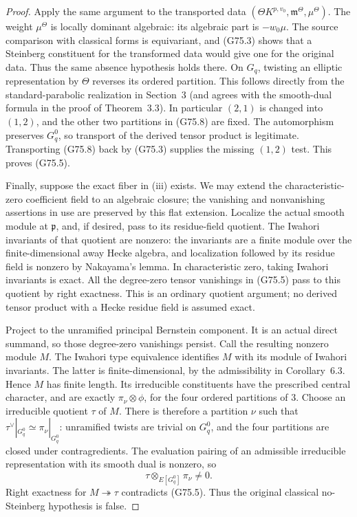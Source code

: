 \begin{proof}
Apply the same argument to the transported data
\((\Theta K^{p,v_0},\mathfrak m^\Theta,\mu^\Theta)\).
The weight \(\mu^\Theta\) is locally dominant algebraic:
its algebraic part is \(-w_0\mu\).
The source comparison with classical forms is equivariant, and
(G75.3) shows that a Steinberg constituent for the transformed
data would give one for the original data.
Thus the same absence hypothesis holds there.
On \(G_q\), twisting an elliptic representation by \(\Theta\)
reverses its ordered partition.  This follows directly from the
standard-parabolic realization in Section~3 (and agrees with the
smooth-dual formula in the proof of Theorem~3.3).
In particular \((2,1)\) is changed into \((1,2)\), and the other
two partitions in (G75.8) are fixed.
The automorphism preserves \(G_q^0\), so transport of the derived
tensor product is legitimate.
Transporting (G75.8) back by (G75.3) supplies the missing
\((1,2)\) test.  This proves (G75.5).

Finally, suppose the exact fiber in (iii) exists.
We may extend the characteristic-zero coefficient field to an
algebraic closure; the vanishing and nonvanishing assertions in use
are preserved by this flat extension.
Localize the actual smooth module at \(\mathfrak p\), and, if desired,
pass to its residue-field quotient.
The Iwahori invariants of that quotient are nonzero: the invariants
are a finite module over the finite-dimensional away Hecke algebra,
and localization followed by its residue field is nonzero by
Nakayama's lemma.  In characteristic zero, taking Iwahori invariants
is exact.
All the degree-zero tensor vanishings in (G75.5) pass to this quotient
by right exactness.  This is an ordinary quotient argument; no
derived tensor product with a Hecke residue field is assumed exact.

Project to the unramified principal Bernstein component.
It is an actual direct summand, so those degree-zero vanishings
persist.  Call the resulting nonzero module \(M\).
The Iwahori type equivalence identifies \(M\) with its module of
Iwahori invariants.  The latter is finite-dimensional, by the
admissibility in Corollary~6.3.  Hence \(M\) has finite length.
Its irreducible constituents have the prescribed central
character, and are exactly
\(\pi_\nu\otimes\phi\), for the four ordered partitions of \(3\).
Choose an irreducible quotient \(\tau\) of \(M\).
There is therefore a partition \(\nu\) such that
\(\tau^\vee|_{G_q^0}\simeq\pi_\nu|_{G_q^0}\):
unramified twists are trivial on \(G_q^0\), and the four partitions
are closed under contragredients.
The evaluation pairing of an admissible irreducible representation
with its smooth dual is nonzero, so
\[
               \tau\otimes_{E[G_q^0]}\pi_\nu\ne0.
\]
Right exactness for \(M\twoheadrightarrow\tau\) contradicts (G75.5).
Thus the original classical no-Steinberg hypothesis is false.


\end{proof}
